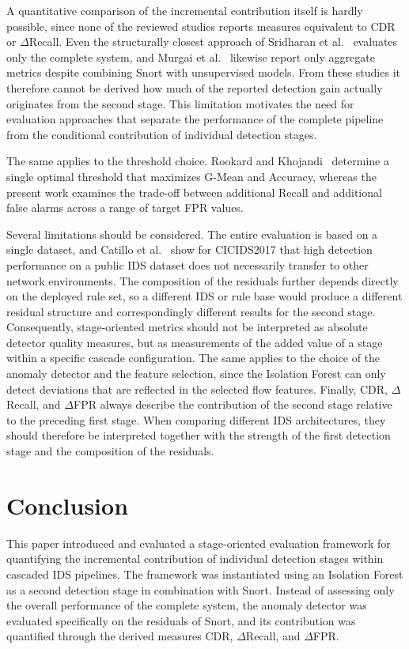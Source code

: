 \documentclass[conference]{IEEEtran}
\begin{document}
A quantitative comparison of the incremental contribution itself is hardly possible, since none of the reviewed studies reports measures equivalent to CDR or $\Delta$Recall. Even the structurally closest approach of Sridharan et al.~\cite{sridharan2025} evaluates only the complete system, and Murgai et al.~\cite{murgai2024} likewise report only aggregate metrics despite combining Snort with unsupervised models. From these studies it therefore cannot be derived how much of the reported detection gain actually originates from the second stage. This limitation motivates the need for evaluation approaches that separate the performance of the complete pipeline from the conditional contribution of individual detection stages.

The same applies to the threshold choice. Rookard and Khojandi~\cite{rookard2025} determine a single optimal threshold that maximizes G-Mean and Accuracy, whereas the present work examines the trade-off between additional Recall and additional false alarms across a range of target FPR values.

Several limitations should be considered. The entire evaluation is based on a single dataset, and Catillo et al.~\cite{catillo2022} show for CICIDS2017 that high detection performance on a public IDS dataset does not necessarily transfer to other network environments. The composition of the residuals further depends directly on the deployed rule set, so a different IDS or rule base would produce a different residual structure and correspondingly different results for the second stage. Consequently, stage-oriented metrics should not be interpreted as absolute detector quality measures, but as measurements of the added value of a stage within a specific cascade configuration. The same applies to the choice of the anomaly detector and the feature selection, since the Isolation Forest can only detect deviations that are reflected in the selected flow features. Finally, CDR, $\Delta$Recall, and $\Delta$FPR always describe the contribution of the second stage relative to the preceding first stage. When comparing different IDS architectures, they should therefore be interpreted together with the strength of the first detection stage and the composition of the residuals. 


\section{Conclusion}
\label{sec:conclusion}
This paper introduced and evaluated a stage-oriented evaluation framework for
quantifying the incremental contribution of individual detection stages within
cascaded IDS pipelines. The framework was instantiated using an Isolation
Forest as a second detection stage in combination with Snort.
Instead of assessing only the overall performance of the complete system, the anomaly detector was evaluated specifically on the residuals of Snort, and its contribution was quantified through the derived measures CDR, $\Delta$Recall, and $\Delta$FPR.
\end{document}
